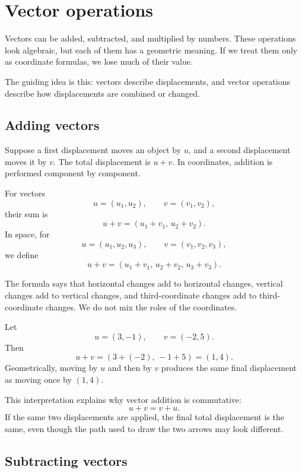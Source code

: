 \section{Vector operations}

Vectors can be added, subtracted, and multiplied by numbers. These operations look algebraic, but each of them has a geometric meaning. If we treat them only as coordinate formulas, we lose much of their value.

The guiding idea is this: vectors describe displacements, and vector operations describe how displacements are combined or changed.

\subsection*{Adding vectors}

Suppose a first displacement moves an object by \(u\), and a second displacement moves it by \(v\). The total displacement is \(u+v\). In coordinates, addition is performed component by component.

\begin{definitionbox}
For vectors
\[
u=(u_1,u_2),
\qquad
v=(v_1,v_2),
\]
their sum is
\[
u+v=(u_1+v_1,\,u_2+v_2).
\]
In space, for
\[
u=(u_1,u_2,u_3),
\qquad
v=(v_1,v_2,v_3),
\]
we define
\[
u+v=(u_1+v_1,\,u_2+v_2,\,u_3+v_3).
\]
\end{definitionbox}

The formula says that horizontal changes add to horizontal changes, vertical changes add to vertical changes, and third-coordinate changes add to third-coordinate changes. We do not mix the roles of the coordinates.

\begin{examplebox}
Let
\[
u=(3,-1),
\qquad
v=(-2,5).
\]
Then
\[
u+v=(3+(-2),\,-1+5)=(1,4).
\]
Geometrically, moving by \(u\) and then by \(v\) produces the same final displacement as moving once by \((1,4)\).
\end{examplebox}

This interpretation explains why vector addition is commutative:
\[
u+v=v+u.
\]
If the same two displacements are applied, the final total displacement is the same, even though the path used to draw the two arrows may look different.

\subsection*{Subtracting vectors}

